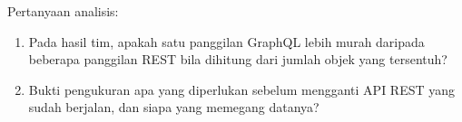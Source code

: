Pertanyaan analisis:
\begin{enumerate}
  \item Pada hasil tim, apakah satu panggilan GraphQL lebih murah daripada beberapa panggilan REST bila dihitung dari jumlah objek yang tersentuh?
  \item Bukti pengukuran apa yang diperlukan sebelum mengganti API REST yang sudah berjalan, dan siapa yang memegang datanya?
\end{enumerate}
